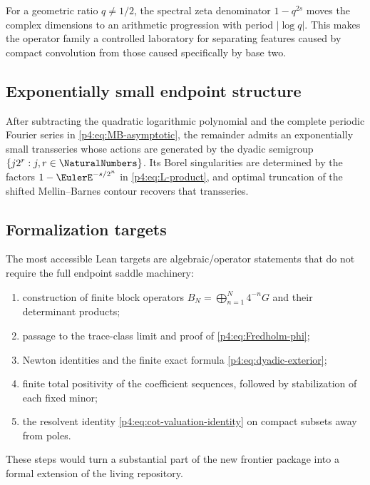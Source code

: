 \documentclass[11pt]{article}
\theoremstyle{definition}
\theoremstyle{remark}
\begin{document}
For a geometric ratio \(q\ne1/2\), the spectral zeta denominator
\(1-q^{2s}\) moves the complex dimensions to an arithmetic progression with period
\(|\log q|\).  This makes the operator family a controlled laboratory for separating
features caused by compact convolution from those caused specifically by base two.

\subsection{Exponentially small endpoint structure}

\begin{conjecture}
\label{p4:conj:resurgence}
After subtracting the quadratic logarithmic polynomial and the complete periodic
Fourier series in \eqref{p4:eq:MB-asymptotic}, the remainder admits an exponentially
small transseries whose actions are generated by the dyadic semigroup
\(\{j2^r:j,r\in\NaturalNumbers\}\).  Its Borel singularities are determined by the factors
\(1-\EulerE^{-s/2^n}\) in \eqref{p4:eq:L-product}, and optimal truncation of the shifted
Mellin--Barnes contour recovers that transseries.
\end{conjecture}

\subsection{Formalization targets}

The most accessible Lean targets are algebraic/operator statements that do not require
the full endpoint saddle machinery:
\begin{enumerate}[leftmargin=2em]
\item construction of finite block operators \(B_N=\bigoplus_{n=1}^N4^{-n}G\) and
      their determinant products;
\item passage to the trace-class limit and proof of \eqref{p4:eq:Fredholm-phi};
\item Newton identities and the finite exact formula \eqref{p4:eq:dyadic-exterior};
\item finite total positivity of the coefficient sequences, followed by stabilization
      of each fixed minor;
\item the resolvent identity \eqref{p4:eq:cot-valuation-identity} on compact subsets away
      from poles.
\end{enumerate}
These steps would turn a substantial part of the new frontier package into a formal
extension of the living repository.
\end{document}
